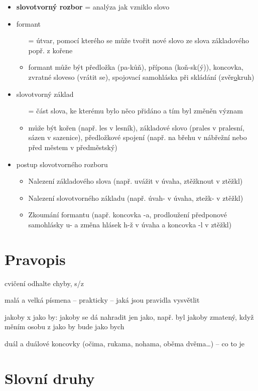 \documentclass{memoir}
\begin{document}
\begin{itemize}
	\item \textbf{slovotvorný rozbor} = analýza jak vzniklo slovo
	\item formant 
	\begin{itemize}
		\item[=] útvar, pomocí kterého se může tvořit nové slovo ze slova základového popř. z kořene
		\item formant může být předložka (pa-kůň), přípona (koň-sk(ý)), koncovka, zvratné sloveso (vrátit se), spojovací samohláska při skládání (zvěr\underline{o}kruh) 
	\end{itemize}
	\item slovotvorný základ 
	\begin{itemize}
		\item[=] část slova, ke kterému bylo něco přidáno a tím byl změněn význam
		\item může být kořen (např. les v lesník), základové slovo (prales v pralesní, sázen v sazenice), předložkové spojení (např. na břehu v nábřežní nebo před městem v předměstský)
	\end{itemize}
	\item postup slovotvorného rozboru
	\begin{itemize}
		\item Nalezení základového slova (např. uvážit v úvaha, ztěžknout v ztěžkl)
		\item Nalezení slovotvorného základu (např. úvah- v úvaha, ztežk- v ztěžkl)
		\item Zkoumání formantu (např. koncovka -a, prodloužení předponové samohlásky u- a změna hlásek h-ž v úvaha a koncovka -l v ztěžkl)
	\end{itemize}
\end{itemize}

\section*{Pravopis}
cvičení odhalte chyby, s/z

malá a velká písmena – prakticky – jaká jsou pravidla vysvětlit

jakoby x jako by: jakoby se dá nahradit jen jako, např. byl jakoby zmatený, když měním osobu z jako by bude jako bych

duál a duálové koncovky (očima, rukama, nohama, oběma dvěma…) – co to je


\section*{Slovní druhy}
\end{document}
